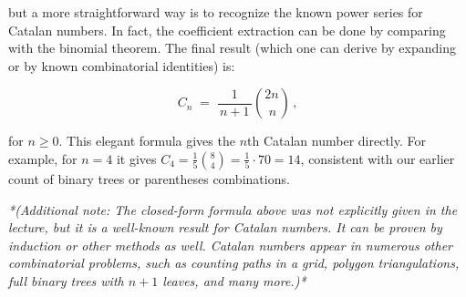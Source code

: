 \documentclass{article}
\begin{document}
but a more straightforward way is to recognize the known power series for Catalan numbers. In fact, the coefficient extraction can be done by comparing with the binomial theorem. The final result (which one can derive by expanding or by known combinatorial identities) is:

\[
C_n \;=\; \frac{1}{\,n+1\,}\binom{2n}{\,n}\,,
\] 

for $n \ge 0$. This elegant formula gives the $n$th Catalan number directly. For example, for $n=4$ it gives $C_4 = \frac{1}{5}\binom{8}{4} = \frac{1}{5}\cdot 70 = 14$, consistent with our earlier count of binary trees or parentheses combinations.

\textit{*(Additional note: The closed-form formula above was not explicitly given in the lecture, but it is a well-known result for Catalan numbers. It can be proven by induction or other methods as well. Catalan numbers appear in numerous other combinatorial problems, such as counting paths in a grid, polygon triangulations, full binary trees with $n+1$ leaves, and many more.)*}
\end{document}
